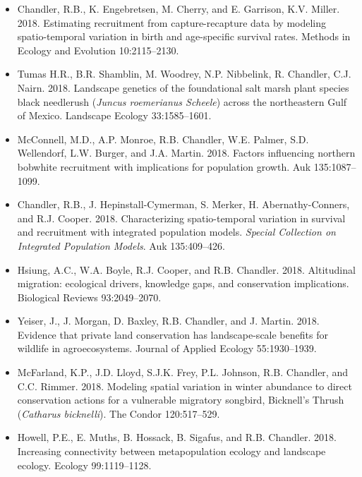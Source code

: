 \begin{itemize}
\item Chandler, R.B., K. Engebretsen, M. Cherry, and E. Garrison, 
  K.V. Miller. 2018. Estimating recruitment from
  capture-recapture data by modeling spatio-temporal variation in
  birth and age-specific survival rates. Methods in Ecology and
  Evolution 10:2115--2130.

\item Tumas H.R., B.R. Shamblin, M. Woodrey, N.P. Nibbelink,
  R. Chandler, C.J. Nairn. 2018. Landscape genetics of the
  foundational salt marsh plant species black needlerush ({\it Juncus
    roemerianus Scheele}) across the northeastern Gulf of
  Mexico. Landscape Ecology 33:1585--1601.
  
\item McConnell, M.D., A.P. Monroe, R.B. Chandler, W.E. Palmer,
  S.D. Wellendorf, L.W. Burger, and J.A. Martin. 2018. Factors
  influencing northern bobwhite recruitment with implications for
  population growth. Auk 135:1087--1099.
  
\item Chandler, R.B., J. Hepinstall-Cymerman, S. Merker, H. Abernathy-Conners,
  and R.J. Cooper. 2018. Characterizing spatio-temporal 
  variation in survival and recruitment with integrated population
  models. {\it Special Collection on Integrated Population
    Models}. Auk 135:409--426. 

\item Hsiung, A.C., W.A. Boyle, R.J. Cooper, and
  R.B. Chandler. 2018. Altitudinal migration: ecological drivers,
  knowledge gaps, and conservation implications. Biological Reviews 
  93:2049--2070. 

\item Yeiser, J., J. Morgan, D. Baxley, R.B. Chandler, and
  J. Martin. 2018. Evidence that private land conservation
  has landscape-scale benefits for wildlife in agroecosystems. Journal
  of Applied Ecology 55:1930--1939. 

\item McFarland, K.P., J.D. Lloyd, S.J.K. Frey, P.L. Johnson,
  R.B. Chandler, and C.C. Rimmer. 2018. Modeling spatial
  variation in winter abundance to direct conservation actions for a
  vulnerable migratory songbird, Bicknell’s Thrush ({\it Catharus
    bicknelli}). The Condor 120:517--529. 

\item Howell, P.E., E. Muths, B. Hossack, B. Sigafus, and
  R.B. Chandler. 2018. Increasing connectivity between 
  metapopulation ecology and landscape ecology. Ecology 99:1119--1128.  
  

\end{itemize}
